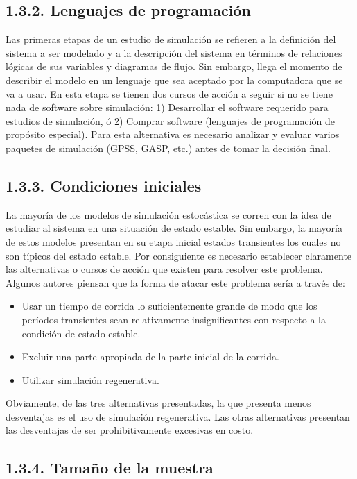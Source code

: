 \documentclass[11pt,letterpaper]{report}
\begin{document}
\subsection*{1.3.2. Lenguajes de programación}

Las primeras etapas de un estudio de simulación se refieren a la
definición del sistema a ser modelado y a la descripción del sistema en
términos de relaciones lógicas de sus variables y diagramas de flujo.
Sin embargo, llega el momento de describir el modelo en un lenguaje que
sea aceptado por la computadora que se va a usar. En esta etapa se
tienen dos cursos de acción a seguir si no se tiene nada de software
sobre simulación: 1) Desarrollar el software requerido para estudios de
simulación, ó 2) Comprar software (lenguajes de programación de
propósito especial). Para esta alternativa es necesario analizar y
evaluar varios paquetes de simulación (GPSS, GASP, etc.) antes de tomar
la decisión final.

\subsection*{1.3.3. Condiciones iniciales}

La mayoría de los modelos de simulación estocástica se corren con la
idea de estudiar al sistema en una situación de estado estable. Sin
embargo, la mayoría de estos modelos presentan en su etapa inicial
estados transientes los cuales no son típicos del estado estable. Por
consiguiente es necesario establecer claramente las alternativas o
cursos de acción que existen para resolver este problema. Algunos
autores piensan que la forma de atacar este problema sería a través de:

\begin{itemize}[leftmargin=*]
\item Usar un tiempo de corrida lo suficientemente grande de modo que
los períodos transientes sean relativamente insignificantes con
respecto a la condición de estado estable.
\item Excluir una parte apropiada de la parte inicial de la corrida.
\item Utilizar simulación regenerativa.
\end{itemize}

Obviamente, de las tres alternativas presentadas, la que presenta menos
desventajas es el uso de simulación regenerativa. Las otras alternativas
presentan las desventajas de ser prohibitivamente excesivas en costo.

\subsection*{1.3.4. Tamaño de la muestra}
\end{document}
